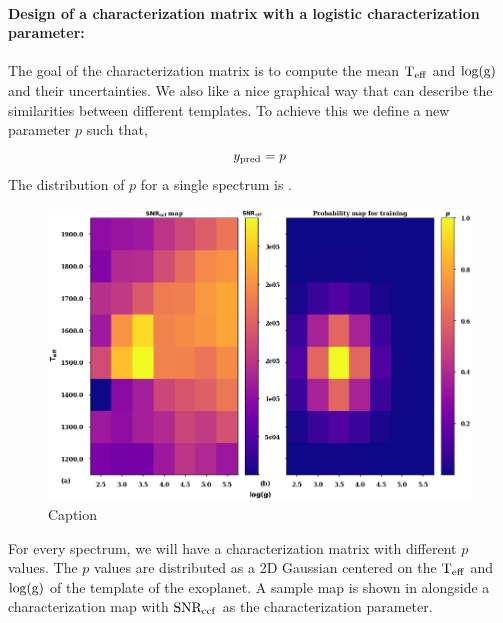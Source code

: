\paragraph{Design of a characterization matrix with a logistic characterization parameter:\\}
The goal of the characterization matrix is to compute the mean $\rm{T_{eff}}$ and $\rm{\log(g)}$ and their uncertainties.
We also like a nice graphical way that can describe the similarities between different templates.
To achieve this we define a new parameter $p$ such that,
\begin{equation}
    y_{\rm{pred}} = p
    \label{eq:p-ypred}
\end{equation}
The distribution of $p$ for a single spectrum is .
\begin{figure}
    \centering
    \includegraphics[width=\textwidth]{images/Chapter3/subplots_snr_p.png}
    \caption{Caption}
    \label{fig:sample charmat}
\end{figure}
For every spectrum, we will have a characterization matrix with different $p$ values.
The $p$ values are distributed as a 2D Gaussian centered on the $\rm{T_{eff}}$ and $\rm{\log(g)}$ of the template of the exoplanet.
A sample map is shown in  alongside a characterization map with $\rm{SNR_{ccf}}$ as the characterization parameter.

